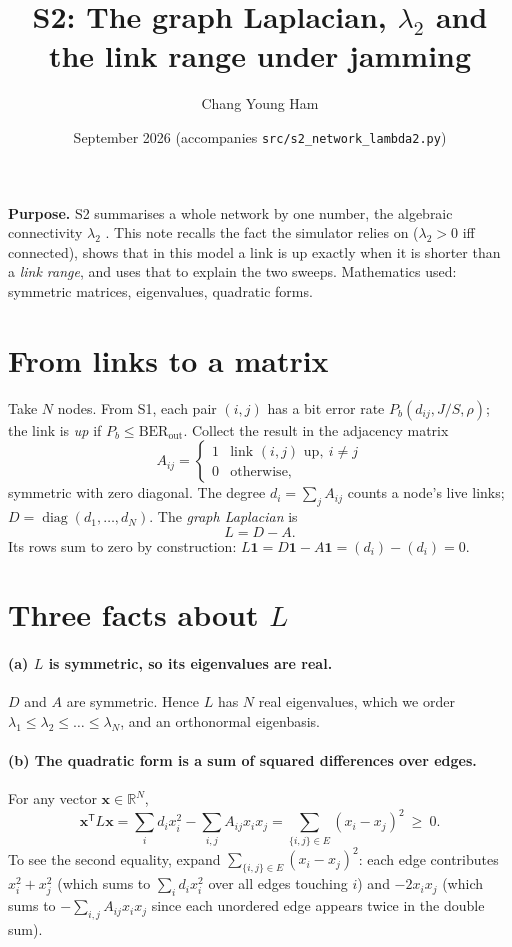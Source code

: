 \documentclass[11pt,a4paper]{article}
\title{S2: The graph Laplacian, $\lambda_2$ and the link range under jamming}
\author{Chang Young Ham}
\date{September 2026 \quad (accompanies \texttt{src/s2\_network\_lambda2.py})}
\newcommand{\bone}{\mathbf 1}
\newcommand{\bx}{\mathbf x}
\newcommand{\T}{^{\mathsf T}}
\newcommand{\BERout}{\mathrm{BER}_{\mathrm{out}}}
\begin{document}
\maketitle

\noindent\textbf{Purpose.}
S2 summarises a whole network by one number, the algebraic connectivity
$\lambda_2$ \cite{fiedler}. This note recalls the fact the simulator relies
on ($\lambda_2>0$ iff connected), shows that in this model a link is up
exactly when it is shorter than a \emph{link range}, and uses that to explain
the two sweeps. Mathematics used: symmetric matrices,
eigenvalues, quadratic forms.

\section{From links to a matrix}

Take $N$ nodes. From S1, each pair $(i,j)$ has a bit error rate
$P_b(d_{ij}, J/S, \rho)$; the link is \emph{up} if $P_b\le\BERout$.
Collect the result in the adjacency matrix
\[
  A_{ij} = \begin{cases} 1 & \text{link } (i,j) \text{ up},\ i\ne j \\ 0 & \text{otherwise,}\end{cases}
\]
symmetric with zero diagonal. The degree $d_i = \sum_j A_{ij}$ counts a node's
live links; $D = \operatorname{diag}(d_1,\dots,d_N)$. The \emph{graph Laplacian} is
\[
  L = D - A .
\]
Its rows sum to zero by construction: $L\bone = D\bone - A\bone = (d_i) - (d_i) = 0$.

\section{Three facts about $L$}

\paragraph{(a) $L$ is symmetric, so its eigenvalues are real.}
$D$ and $A$ are symmetric. Hence $L$ has $N$ real eigenvalues, which we order
$\lambda_1\le\lambda_2\le\dots\le\lambda_N$, and an orthonormal eigenbasis.

\paragraph{(b) The quadratic form is a sum of squared differences over edges.}
For any vector $\bx\in\mathbb R^N$,
\begin{equation}
  \bx\T L\bx = \sum_i d_i x_i^2 - \sum_{i,j}A_{ij}x_ix_j
             = \sum_{\{i,j\}\in E}(x_i - x_j)^2 \ \ge\ 0 .
  \label{eq:qf}
\end{equation}
To see the second equality, expand $\sum_{\{i,j\}\in E}(x_i-x_j)^2$: each
edge contributes $x_i^2 + x_j^2$ (which sums to $\sum_i d_ix_i^2$ over all edges
touching $i$) and $-2x_ix_j$ (which sums to $-\sum_{i,j}A_{ij}x_ix_j$ since each
unordered edge appears twice in the double sum).
\end{document}
